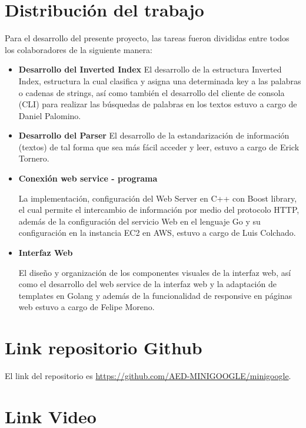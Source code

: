 \documentclass[a4paper]{article}
\begin{document}
\section{Distribución del trabajo}

Para el desarrollo del presente proyecto, las tareas fueron divididas entre todos los colaboradores de la siguiente manera:
\begin{itemize}
    \item \textbf{Desarrollo del Inverted Index} El desarrollo de la estructura Inverted Index, estructura la cual clasifica y asigna una determinada key a las palabras o cadenas de strings, así como también el desarrollo del cliente de consola (CLI) para realizar las búsquedas de palabras en los textos estuvo a cargo de Daniel Palomino. 
    
    \item \textbf{Desarrollo del Parser} El desarrollo de la estandarización de información (textos) de tal forma que sea más fácil acceder y leer, estuvo a cargo de Erick Tornero.
    
     \item \textbf{Conexión web service - programa}
     
     La implementación, configuración del Web Server en C++ con Boost library, el cual permite el intercambio de información por medio del protocolo HTTP, además de la configuración del servicio Web en el lenguaje Go y su configuración en la instancia EC2 en AWS, estuvo a cargo de Luis Colchado.
    
    \item \textbf{Interfaz Web}
    
    El diseño y organización de los componentes visuales de la interfaz web, así como el desarrollo del web service de la interfaz web y la adaptación de templates en Golang y además de la funcionalidad de responsive en páginas web estuvo a cargo de Felipe Moreno.
\end{itemize}

\section{Link repositorio Github}

El link del repositorio es \url{https://github.com/AED-MINIGOOGLE/minigoogle}.

\section{Link Video}
\end{document}
